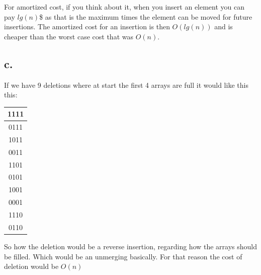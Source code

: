 \documentclass[12pt,a4paper]{report}
\begin{document}
For amortized cost, if you think about it, when you insert an element you can pay $lg(n)$\$ as that is the maximum times the element can be moved for future insertions. The amortized cost for an insertion is then $O(lg(n))$ and is cheaper than the worst case cost that was $O(n)$.

\subsection*{c.}
If we have 9 deletions where at start the first 4 arrays are full it would like this this:

\begin{tabular}{|c|}
\hline 
1111 \\ 
\hline 
0111 \\ 
\hline 
1011 \\ 
\hline 
0011 \\ 
\hline 
1101 \\ 
\hline 
0101 \\ 
\hline 
1001 \\ 
\hline 
0001 \\ 
\hline 
1110 \\ 
\hline 
0110 \\ 
\hline 
\end{tabular} 

So how the deletion would be a reverse insertion, regarding how the arrays should be filled. Which would be an unmerging basically.
For that reason the cost of deletion would be $O(n)$
\end{document}
